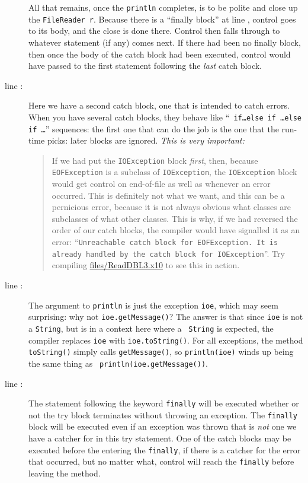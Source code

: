 \begin{description}
All that remains, once the {\tt println} completes, is to be polite and
close up the {\tt FileReader r}.  Because there is a ``finally block'' at line
, control goes to its body, and the close is done there.  Control then falls
through to whatever statement (if any) comes next.  If there had been no finally block,
then once the body of the catch block had been executed, control would have
passed to the first statement following the {\em last} catch block.
\item[line \xlref{readdbl2-catch2}{12}:] Here we have a second catch block, one that is intended to
catch errors.  When you have several catch blocks, they behave like ``{\tt
if\ldots else if \ldots else if \ldots}'' sequences: the first one that can do
the job is the one that the run-time picks: later blocks are ignored.  {\em
This is very important:}
\begin{quote}
If we had put the {\tt IOException} block {\em first}, then, because {\tt
EOF\-Ex\-cep\-tion} is a subclass of {\tt IO\-Ex\-cep\-tion}, the
{\tt IOException} block would
get control on end-of-file as well as whenever an error occurred.  This is
definitely not what we want, and this can be a pernicious error, because it is
not always obvious what classes are subclasses of what other classes.  This
is why, if we had reversed the order of our catch blocks, the compiler
would have signalled it as an error: ``{\tt Unreachable catch block for
EOFException. It is already handled by the catch block for IOException}''.  Try
compiling 
\href{http://dist.codehaus.org/x10/documentation/guide/src/files/ReadDBL3.x10}{files/ReadDBL3.x10}
to see this in action.
\end{quote}
\item[line \xlref{readdbl2-printioe}{13}: ] The argument to {\tt println} is just the exception {\tt ioe},
which may seem surprising: why not {\tt ioe.getMessage()}?  The answer is that
since {\tt ioe} is not a {\tt String}, but is in a context here where a {\tt
String} is expected, the compiler replaces {\tt ioe} with {\tt ioe.toString()}. 
For all exceptions, the method {\tt toString()} simply calls {\tt getMessage()},
so {\tt println(ioe)} winds up being the same thing as {\tt
println(ioe.getMessage())}.
\item[line \xlref{readdbl2-finally}{14}: ] The statement following the keyword {\tt finally} will be
executed whether or not the try block terminates without throwing an exception.
The {\tt finally} block will be executed even if an exception was thrown that is
{\em not} one we have a catcher for in this try statement. One of the catch
blocks may be executed before the entering the {\tt finally}, if there is a
catcher for the error that occurred, but no matter what, control will
reach the {\tt finally} before leaving the method.


\end{description}
